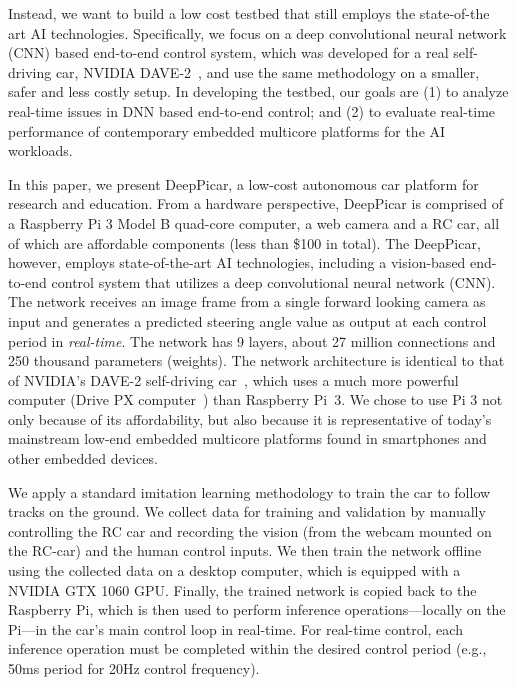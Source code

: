 Instead, we want to build a low cost testbed that still employs the
state-of-the art AI technologies. Specifically, we focus on a deep
convolutional neural network (CNN) based end-to-end control system,
which was developed for a real self-driving car, NVIDIA
DAVE-2~\cite{Bojarski2016}, and use the same methodology on a
smaller, safer and less costly setup. In developing the testbed, our
goals are (1) to analyze real-time issues in DNN based end-to-end
control; and (2) to evaluate real-time performance of contemporary embedded
multicore platforms for the AI workloads.

In this paper, we present DeepPicar, a low-cost autonomous car
platform for research and education. From a hardware perspective,
DeepPicar is comprised of a Raspberry Pi 3 Model B quad-core
computer, a web camera and a RC car, all of which are affordable
components (less than \$100 in total).
The DeepPicar, however, employs state-of-the-art AI
technologies, including a vision-based end-to-end control system that
utilizes a deep convolutional neural network (CNN).
The network receives an image frame from a single forward
looking camera as input and generates a predicted steering angle
value as output at each control period in \emph{real-time}.
The network has 9 layers, about 27 million connections
and 250 thousand parameters (weights).
The network architecture is identical to that of NVIDIA's DAVE-2
self-driving car~\cite{Bojarski2016}, which uses a much more powerful
computer (Drive PX computer~\cite{drivepx}) than Raspberry Pi~3.
We chose to use Pi 3 not only because of its
affordability, but also because it is representative
of today's mainstream low-end embedded multicore platforms found in
smartphones and other embedded devices.


We apply a standard imitation learning methodology to train the car to
follow tracks on the ground. We collect data for
training and validation by manually
controlling the RC car and recording the vision (from the webcam
mounted on the RC-car) and the human control inputs. We then train the
network offline using the collected data on a desktop computer, which
is equipped with a NVIDIA GTX 1060 GPU. Finally, the trained network is copied
back to the Raspberry Pi, which is then used to perform inference
operations---locally on the Pi---in the car's main control loop in
real-time. For real-time control, each inference operation must
be completed within the desired control period (e.g., 50ms period for
20Hz control frequency).

